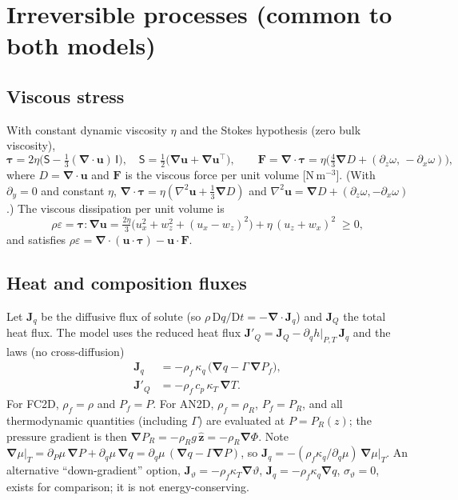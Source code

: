 \documentclass[11pt,a4paper]{article}
\newcommand{\vt}{\vartheta}                    %
\newcommand{\bu}{\mathbf{u}}
\newcommand{\ez}{\hat{\mathbf{z}}}
\newcommand{\bJ}{\mathbf{J}}
\newcommand{\bF}{\mathbf{F}}
\newcommand{\bnabla}{\boldsymbol{\nabla}}
\newcommand{\btau}{\boldsymbol{\tau}}
\begin{document}
\section{Irreversible processes (common to both models)}\label{sec:irr}
\subsection{Viscous stress}
With constant dynamic viscosity $\eta$ and the Stokes hypothesis (zero bulk viscosity),
\begin{equation}
  \btau = 2\eta\Big(\mathsf S-\tfrac13(\bnabla\!\cdot\bu)\,\mathsf I\Big),\quad
  \mathsf S=\tfrac12\big(\bnabla\bu+\bnabla\bu^{\!\top}\big),\qquad
  \bF=\bnabla\!\cdot\btau = \eta\Big(\tfrac43\bnabla D + (\partial_z\omega,\,-\partial_x\omega)\Big),
  \label{eq:tau}
\end{equation}
where $D=\bnabla\!\cdot\bu$ and $\bF$ is the viscous force per unit volume [N\,m$^{-3}$]. (With $\partial_y=0$ and constant $\eta$,
$\bnabla\!\cdot\btau=\eta(\nabla^2\bu+\tfrac13\bnabla D)$ and $\nabla^2\bu=\bnabla D+(\partial_z\omega,-\partial_x\omega)$.) The viscous dissipation per unit volume is
\begin{equation}
  \rho\varepsilon = \btau:\bnabla\bu
  = \tfrac{2\eta}{3}\big(u_x^2+w_z^2+(u_x-w_z)^2\big)+\eta\,(u_z+w_x)^2\;\ge 0,
  \label{eq:diss}
\end{equation}
and satisfies $\rho\varepsilon=\bnabla\!\cdot(\bu\cdot\btau)-\bu\cdot\bF$.

\subsection{Heat and composition fluxes}
Let $\bJ_q$ be the diffusive flux of solute (so $\rho\,\mathrm{D}q/\mathrm{D}t=-\bnabla\!\cdot\bJ_q$) and $\bJ_Q$ the total heat flux. The model uses
the reduced heat flux $\bJ'_Q=\bJ_Q-\partial_qh|_{P,T}\,\bJ_q$ and the laws (no cross-diffusion)
\begin{align}
  \bJ_q &= -\rho_f\,\kappa_q\,\big(\bnabla q-\Gamma\,\bnabla P_f\big),\label{eq:Jq}\\
  \bJ'_Q &= -\rho_f\,c_p\,\kappa_T\,\bnabla T .\label{eq:JQ}
\end{align}
For FC2D, $\rho_f=\rho$ and $P_f=P$. For AN2D, $\rho_f=\rho_R$, $P_f=P_R$, and all thermodynamic quantities (including $\Gamma$) are evaluated at $P=P_R(z)$; the pressure gradient is then $\bnabla P_R=-\rho_Rg\,\ez=-\rho_R\bnabla\Phi$.
Note $\bnabla\mu|_T=\partial_P\mu\,\bnabla P+\partial_q\mu\,\bnabla q=\partial_q\mu\,(\bnabla q-\Gamma\bnabla P)$, so $\bJ_q=-(\rho_f\kappa_q/\partial_q\mu)\,\bnabla\mu|_T$.
An alternative ``down-gradient'' option, $\bJ_\vt=-\rho_f\kappa_T\bnabla\vt$, $\bJ_q=-\rho_f\kappa_q\bnabla q$, $\sigma_\vt=0$, exists for comparison; it is not energy-conserving.
\end{document}
